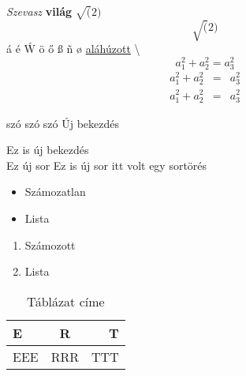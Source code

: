 \documentclass[]{article}
\begin{document}
\textit{Szevasz} \textbf{világ} $\sqrt(2)$
 $$\sqrt(2)$$
 \'a \'e \'W
 \"o
 \H{o}
 \ss
 \~n
 \o
 \underline{aláhúzott}
\textbackslash
\begin{equation}
	a_1^2+a_2^2=a_3^2
\end{equation}
\begin{eqnarray}
	a_1^2+a_2^2&=&a_3^2\\
	a_1^2+a_2^2&=&a_3^2
\end{eqnarray}
\iffalse
Ez a rész egy komment
és többsoros.
\fi
\begin{flushleft}
	\blindtext
\end{flushleft}
\begin{center}
	\blindtext
\end{center}
szó  szó                    szó
Új bekezdés \par
Ez is új bekezdés\\
Ez új sor \newline
Ez is új sor \linebreak
itt volt egy sortörés
\begin{itemize}
	\item Számozatlan
	\item Lista
\end{itemize}
\begin{enumerate}
	\item Számozott 
	\item Lista
\end{enumerate}
\begin{table}
	\caption{Táblázat címe}
	\begin{tabular}{|l||cr|}
		E&R&T\\ \hline
		EEE&RRR&TTT\\ \hline
	\end{tabular}
\end{table}
\end{document}
